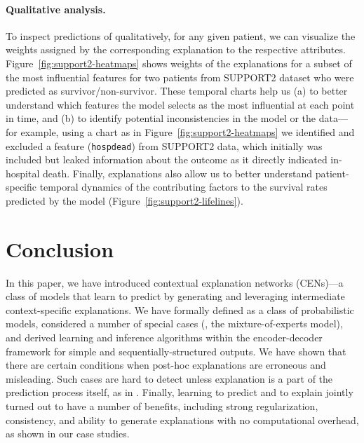 \documentclass[twoside,11pt]{article}
\begin{document}
\paragraph{Qualitative analysis.}
To inspect predictions of {\CENs} qualitatively, for any given patient, we can visualize the weights assigned by the corresponding explanation to the respective attributes.
Figure~\ref{fig:support2-heatmaps} shows weights of the explanations for a subset of the most influential features for two patients from SUPPORT2 dataset who were predicted as survivor/non-survivor.
These temporal charts help us (a) to better understand which features the model selects as the most influential at each point in time, and (b) to identify potential inconsistencies in the model or the data---for example, using a chart as in Figure~\ref{fig:support2-heatmaps} we identified and excluded a feature (\texttt{hospdead}) from SUPPORT2 data, which initially was included but leaked information about the outcome as it directly indicated in-hospital death.
Finally, explanations also allow us to better understand patient-specific temporal dynamics of the contributing factors to the survival rates predicted by the model (Figure~\ref{fig:support2-lifelines}).
 
\section{Conclusion}
\label{sec:conclusion}

In this paper, we have introduced contextual explanation networks (CENs)---a class of models that learn to predict by generating and leveraging intermediate context-specific explanations.
We have formally defined {\CENs} as a class of probabilistic models, considered a number of special cases (\eg, the mixture-of-experts model), and derived learning and inference algorithms within the encoder-decoder framework for simple and sequentially-structured outputs.
We have shown that there are certain conditions when post-hoc explanations are erroneous and misleading.
Such cases are hard to detect unless explanation is a part of the prediction process itself, as in {\CEN}.
Finally, learning to predict and to explain jointly turned out to have a number of benefits, including strong regularization, consistency, and ability to generate explanations with no computational overhead, as shown in our case studies.
\end{document}
